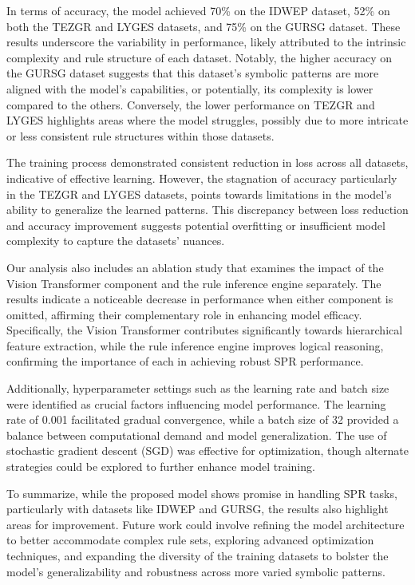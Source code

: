 \documentclass{article}
\begin{document}
In terms of accuracy, the model achieved 70\% on the IDWEP dataset, 52\% on both the TEZGR and LYGES datasets, and 75\% on the GURSG dataset. These results underscore the variability in performance, likely attributed to the intrinsic complexity and rule structure of each dataset. Notably, the higher accuracy on the GURSG dataset suggests that this dataset's symbolic patterns are more aligned with the model's capabilities, or potentially, its complexity is lower compared to the others. Conversely, the lower performance on TEZGR and LYGES highlights areas where the model struggles, possibly due to more intricate or less consistent rule structures within those datasets.

The training process demonstrated consistent reduction in loss across all datasets, indicative of effective learning. However, the stagnation of accuracy particularly in the TEZGR and LYGES datasets, points towards limitations in the model's ability to generalize the learned patterns. This discrepancy between loss reduction and accuracy improvement suggests potential overfitting or insufficient model complexity to capture the datasets' nuances.

Our analysis also includes an ablation study that examines the impact of the Vision Transformer component and the rule inference engine separately. The results indicate a noticeable decrease in performance when either component is omitted, affirming their complementary role in enhancing model efficacy. Specifically, the Vision Transformer contributes significantly towards hierarchical feature extraction, while the rule inference engine improves logical reasoning, confirming the importance of each in achieving robust SPR performance.

Additionally, hyperparameter settings such as the learning rate and batch size were identified as crucial factors influencing model performance. The learning rate of 0.001 facilitated gradual convergence, while a batch size of 32 provided a balance between computational demand and model generalization. The use of stochastic gradient descent (SGD) was effective for optimization, though alternate strategies could be explored to further enhance model training.

To summarize, while the proposed model shows promise in handling SPR tasks, particularly with datasets like IDWEP and GURSG, the results also highlight areas for improvement. Future work could involve refining the model architecture to better accommodate complex rule sets, exploring advanced optimization techniques, and expanding the diversity of the training datasets to bolster the model's generalizability and robustness across more varied symbolic patterns.
\end{document}
